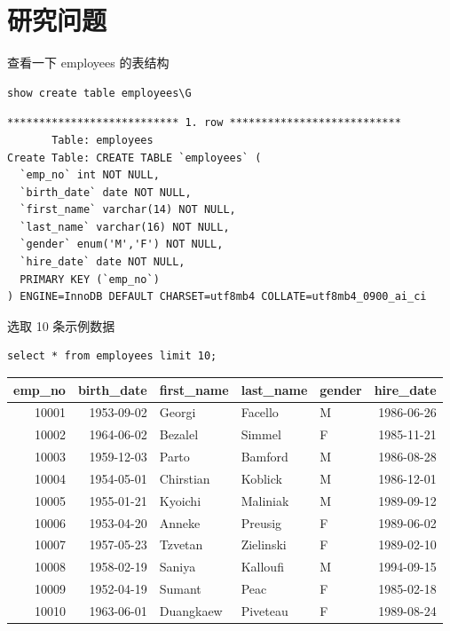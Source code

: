 \documentclass[presentation]{beamer}
\begin{document}
\section{研究问题}
\label{sec:org803c226}
\begin{frame}[label={sec:org06b9ce9},fragile]{查看一下 employees 的表结构}
 \begin{verbatim}
show create table employees\G
\end{verbatim}

\begin{verbatim}
*************************** 1. row ***************************
       Table: employees
Create Table: CREATE TABLE `employees` (
  `emp_no` int NOT NULL,
  `birth_date` date NOT NULL,
  `first_name` varchar(14) NOT NULL,
  `last_name` varchar(16) NOT NULL,
  `gender` enum('M','F') NOT NULL,
  `hire_date` date NOT NULL,
  PRIMARY KEY (`emp_no`)
) ENGINE=InnoDB DEFAULT CHARSET=utf8mb4 COLLATE=utf8mb4_0900_ai_ci
\end{verbatim}
\end{frame}

\begin{frame}[label={sec:org77b559c},fragile]{选取 10 条示例数据}
 \begin{verbatim}
select * from employees limit 10;
\end{verbatim}

\begin{center}
\begin{tabular}{rrlllr}
emp\_no & birth\_date & first\_name & last\_name & gender & hire\_date\\
\hline
10001 & 1953-09-02 & Georgi & Facello & M & 1986-06-26\\
10002 & 1964-06-02 & Bezalel & Simmel & F & 1985-11-21\\
10003 & 1959-12-03 & Parto & Bamford & M & 1986-08-28\\
10004 & 1954-05-01 & Chirstian & Koblick & M & 1986-12-01\\
10005 & 1955-01-21 & Kyoichi & Maliniak & M & 1989-09-12\\
10006 & 1953-04-20 & Anneke & Preusig & F & 1989-06-02\\
10007 & 1957-05-23 & Tzvetan & Zielinski & F & 1989-02-10\\
10008 & 1958-02-19 & Saniya & Kalloufi & M & 1994-09-15\\
10009 & 1952-04-19 & Sumant & Peac & F & 1985-02-18\\
10010 & 1963-06-01 & Duangkaew & Piveteau & F & 1989-08-24\\
\end{tabular}
\end{center}
\end{frame}
\end{document}
